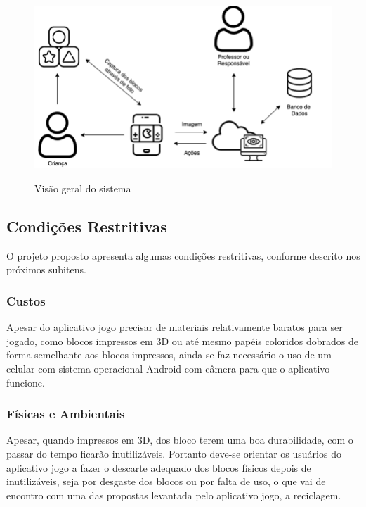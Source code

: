     \begin{figure}[H]
        \caption{Visão geral do sistema}
        \centering
        \includegraphics[width=\linewidth]{Imagens/Cap3/diagrama_blocos.png}
        \label{figura:diagrama_blocos}
    \end{figure}
    
    \subsection{Condições Restritivas}
    O projeto proposto apresenta algumas condições restritivas, conforme descrito nos próximos subitens.

        \subsubsection{Custos}
        Apesar do aplicativo jogo precisar de materiais relativamente baratos para ser jogado, como blocos impressos em 3D ou até mesmo papéis coloridos dobrados de forma semelhante aos blocos impressos, ainda se faz necessário o uso de um celular com sistema operacional Android com câmera para que o aplicativo funcione. 
            
        \subsubsection{Físicas e Ambientais}
        Apesar, quando impressos em 3D, dos bloco terem uma boa durabilidade, com o passar do tempo ficarão inutilizáveis. Portanto deve-se orientar os usuários do aplicativo jogo a fazer o descarte adequado dos blocos físicos depois de inutilizáveis, seja por desgaste dos blocos ou por falta de uso, o que vai de encontro com uma das propostas levantada pelo aplicativo jogo, a reciclagem.
        

